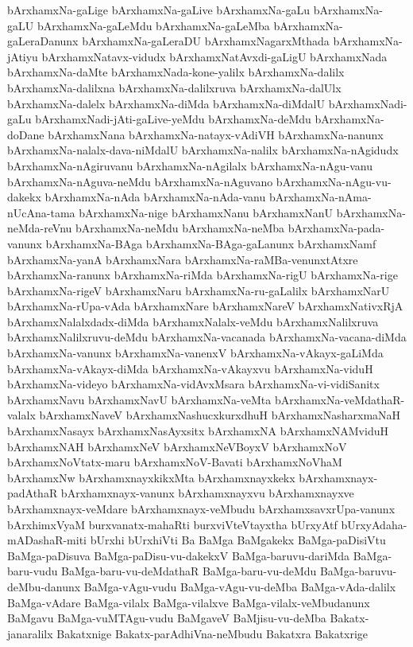 {bArxhamxNa-gaLige
bArxhamxNa-gaLive
bArxhamxNa-gaLu
bArxhamxNa-gaLU
bArxhamxNa-gaLeMdu
bArxhamxNa-gaLeMba
bArxhamxNa-gaLeraDanunx
bArxhamxNa-gaLeraDU
bArxhamxNagarxMthada
bArxhamxNa-jAtiyu
bArxhamxNatavx-vidudx
bArxhamxNatAvxdi-gaLigU
bArxhamxNada
bArxhamxNa-daMte
bArxhamxNada-kone-yalilx
bArxhamxNa-dalilx
bArxhamxNa-dalilxna
bArxhamxNa-dalilxruva
bArxhamxNa-dalUlx
bArxhamxNa-dalelx
bArxhamxNa-diMda
bArxhamxNa-diMdalU
bArxhamxNadi-gaLu
bArxhamxNadi-jAti-gaLive-yeMdu
bArxhamxNa-deMdu
bArxhamxNa-doDane
bArxhamxNana
bArxhamxNa-natayx-vAdiVH
bArxhamxNa-nanunx
bArxhamxNa-nalalx-dava-niMdalU
bArxhamxNa-nalilx
bArxhamxNa-nAgidudx
bArxhamxNa-nAgiruvanu
bArxhamxNa-nAgilalx
bArxhamxNa-nAgu-vanu
bArxhamxNa-nAguva-neMdu
bArxhamxNa-nAguvano
bArxhamxNa-nAgu-vu-dakekx
bArxhamxNa-nAda
bArxhamxNa-nAda-vanu
bArxhamxNa-nAma-nUcAna-tama
bArxhamxNa-nige
bArxhamxNanu
bArxhamxNanU
bArxhamxNa-neMda-reVnu
bArxhamxNa-neMdu
bArxhamxNa-neMba
bArxhamxNa-pada-vanunx
bArxhamxNa-BAga
bArxhamxNa-BAga-gaLanunx
bArxhamxNamf
bArxhamxNa-yanA
bArxhamxNara
bArxhamxNa-raMBa-venunxtAtxre
bArxhamxNa-ranunx
bArxhamxNa-riMda
bArxhamxNa-rigU
bArxhamxNa-rige
bArxhamxNa-rigeV
bArxhamxNaru
bArxhamxNa-ru-gaLalilx
bArxhamxNarU
bArxhamxNa-rUpa-vAda
bArxhamxNare
bArxhamxNareV
bArxhamxNativxRjA
bArxhamxNalalxdadx-diMda
bArxhamxNalalx-veMdu
bArxhamxNalilxruva
bArxhamxNalilxruvu-deMdu
bArxhamxNa-vacanada
bArxhamxNa-vacana-diMda
bArxhamxNa-vanunx
bArxhamxNa-vanenxV
bArxhamxNa-vAkayx-gaLiMda
bArxhamxNa-vAkayx-diMda
bArxhamxNa-vAkayxvu
bArxhamxNa-viduH
bArxhamxNa-videyo
bArxhamxNa-vidAvxMsara
bArxhamxNa-vi-vidiSanitx
bArxhamxNavu
bArxhamxNavU
bArxhamxNa-veMta
bArxhamxNa-veMdathaR-valalx
bArxhamxNaveV
bArxhamxNashucxkurxdhuH
bArxhamxNasharxmaNaH
bArxhamxNasayx
bArxhamxNasAyxsitx
bArxhamxNA
bArxhamxNAMviduH
bArxhamxNAH
bArxhamxNeV
bArxhamxNeVBoyxV
bArxhamxNoV
bArxhamxNoVtatx-maru
bArxhamxNoV-Bavati
bArxhamxNoVhaM
bArxhamxNw
bArxhamxnayxkikxMta
bArxhamxnayxkekx
bArxhamxnayx-padAthaR
bArxhamxnayx-vanunx
bArxhamxnayxvu
bArxhamxnayxve
bArxhamxnayx-veMdare
bArxhamxnayx-veMbudu
bArxhamxsavxrUpa-vanunx
bArxhimxVyaM
burxvanatx-mahaRti
burxviVteVtayxtha
bUrxyAtf
bUrxyAdaha-mADashaR-miti
bUrxhi
bUrxhiVti
Ba
BaMga
BaMgakekx
BaMga-paDisiVtu
BaMga-paDisuva
BaMga-paDisu-vu-dakekxV
BaMga-baruvu-dariMda
BaMga-baru-vudu
BaMga-baru-vu-deMdathaR
BaMga-baru-vu-deMdu
BaMga-baruvu-deMbu-danunx
BaMga-vAgu-vudu
BaMga-vAgu-vu-deMba
BaMga-vAda-dalilx
BaMga-vAdare
BaMga-vilalx
BaMga-vilalxve
BaMga-vilalx-veMbudanunx
BaMgavu
BaMga-vuMTAgu-vudu
BaMgaveV
BaMjisu-vu-deMba
Bakatx-janaralilx
Bakatxnige
Bakatx-parAdhiVna-neMbudu
Bakatxra
Bakatxrige
}
